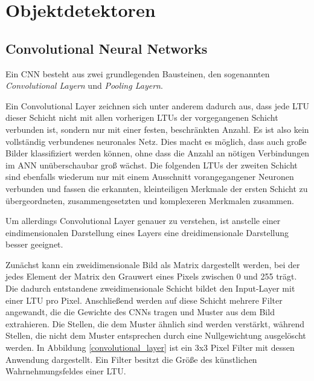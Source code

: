 \section{Objektdetektoren}

\subsection{Convolutional Neural Networks}

Ein CNN besteht aus zwei grundlegenden Bausteinen, den sogenannten \textit{Convolutional Layern} und \textit{Pooling Layern}.

Ein Convolutional Layer zeichnen sich unter anderem dadurch aus, dass jede LTU dieser Schicht nicht mit allen vorherigen LTUs der vorgegangenen Schicht verbunden ist, sondern nur mit einer festen, beschränkten Anzahl. Es ist also kein vollständig verbundenes neuronales Netz. Dies macht es möglich, dass auch große Bilder klassifiziert werden können, ohne dass die Anzahl an nötigen Verbindungen im ANN unüberschaubar groß wächst. Die folgenden LTUs der zweiten Schicht sind ebenfalls wiederum nur mit einem Ausschnitt vorangegangener Neuronen verbunden und fassen die erkannten, kleinteiligen Merkmale der ersten Schicht zu übergeordneten, zusammengesetzten und komplexeren Merkmalen zusammen. \cite[S. 361]{AurelienGeron.2018}

Um allerdings Convolutional Layer genauer zu verstehen, ist anstelle einer eindimensionalen Darstellung eines Layers eine dreidimensionale Darstellung besser geeignet.

Zunächst kann ein zweidimensionale Bild als Matrix dargestellt werden, bei der jedes Element der Matrix den Grauwert eines Pixels zwischen 0 und 255 trägt. Die dadurch entstandene zweidimensionale Schicht bildet den Input-Layer mit einer LTU pro Pixel. Anschließend werden auf diese Schicht mehrere Filter angewandt, die die Gewichte des CNNs tragen und Muster aus dem Bild extrahieren. Die Stellen, die dem Muster ähnlich sind werden verstärkt, während Stellen, die nicht dem Muster entsprechen durch eine Nullgewichtung ausgelöscht werden. In Abbildung \ref{convolutional_layer} ist ein 3x3 Pixel Filter mit dessen Anwendung dargestellt. Ein Filter besitzt die Größe des künstlichen Wahrnehmungsfeldes einer LTU. \cite[S. 362 f.]{AurelienGeron.2018}

